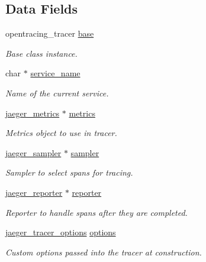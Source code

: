 \subsection*{Data Fields}
\begin{DoxyCompactItemize}
\item 
opentracing\+\_\+tracer \mbox{\hyperlink{structjaeger__tracer_a0cb44e6988002ef749df0f3a44a8c6fc}{base}}
\begin{DoxyCompactList}\small\item\em Base class instance. \end{DoxyCompactList}\item 
char $\ast$ \mbox{\hyperlink{structjaeger__tracer_a2f266f1e4c48383eb3460f3a042a14c3}{service\+\_\+name}}
\begin{DoxyCompactList}\small\item\em Name of the current service. \end{DoxyCompactList}\item 
\mbox{\hyperlink{structjaeger__metrics}{jaeger\+\_\+metrics}} $\ast$ \mbox{\hyperlink{structjaeger__tracer_a1dd0f33dd401acec1affee5e74e4ce1a}{metrics}}
\begin{DoxyCompactList}\small\item\em Metrics object to use in tracer. \end{DoxyCompactList}\item 
\mbox{\hyperlink{structjaeger__sampler}{jaeger\+\_\+sampler}} $\ast$ \mbox{\hyperlink{structjaeger__tracer_a988ac3ac189df44661bedc45d55b56c8}{sampler}}
\begin{DoxyCompactList}\small\item\em Sampler to select spans for tracing. \end{DoxyCompactList}\item 
\mbox{\hyperlink{structjaeger__reporter}{jaeger\+\_\+reporter}} $\ast$ \mbox{\hyperlink{structjaeger__tracer_ade315b4e4a1bef2bbccee5f9e8bb4f3d}{reporter}}
\begin{DoxyCompactList}\small\item\em Reporter to handle spans after they are completed. \end{DoxyCompactList}\item 
\mbox{\hyperlink{structjaeger__tracer__options}{jaeger\+\_\+tracer\+\_\+options}} \mbox{\hyperlink{structjaeger__tracer_ac75ef3b2257e8ba0eea1dfb8828ec193}{options}}
\begin{DoxyCompactList}\small\item\em Custom options passed into the tracer at construction. \end{DoxyCompactList}\item 

\end{DoxyCompactItemize}
